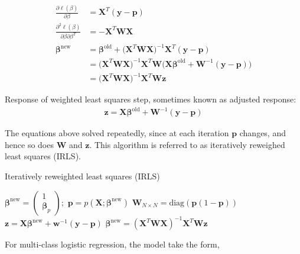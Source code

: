 \documentclass[12pt,a4paper]{article}%
\theoremstyle{definition}
\theoremstyle{plain}
\numberwithin{equation}{section}
\newcounter{subsubsubsection}[subsubsection]
\begin{document}
\begin{align*}
\frac{\partial \ell(\beta)}{\partial \beta} & = \mathbf{X}^{T}(\mathbf{y}-\mathbf{p}) \\
\frac{\partial^{2} \ell(\beta)}{\partial \beta \partial \beta^{T}}  & = -\mathbf{X}^{T} \mathbf{W} \mathbf{X} \\
\boldsymbol{\beta}^{\text{new}} &= \boldsymbol{\beta}^{\text{old}} + \big( \mathbf{X}^{T} \mathbf{W} \mathbf{X} \big)^{-1} \mathbf{X}^{T}(\mathbf{y}-\mathbf{p}) \\
 & = \big( \mathbf{X}^{T} \mathbf{W} \mathbf{X} \big)^{-1} \mathbf{X}^{T} \mathbf{W} \big( \mathbf{X} \boldsymbol{\beta}^{\text{old}} +  \mathbf{W}^{-1}(\mathbf{y}-\mathbf{p})\big) \\
 & = \big( \mathbf{X}^{T} \mathbf{W} \mathbf{X} \big)^{-1} \mathbf{X}^{T} \mathbf{W} \mathbf{z}
\end{align*}

Response of weighted least squares step, sometimes known as adjusted response:
\begin{gather}
\mathbf{z} = \mathbf{X} \boldsymbol{\beta}^{\text{old}} +  \mathbf{W}^{-1}(\mathbf{y}-\mathbf{p})
\end{gather}

The equations above solved repeatedly, since at each iteration $\mathbf{p}$ changes, and hence so does $\mathbf{W}$ and $\mathbf{z}$.
This algorithm is referred to as iteratively reweighed least squares (IRLS).

\begin{algorithm}[H]
\caption{Iteratively reweighted least squares (IRLS)}\label{euclid}
\begin{algorithmic}[1]
\State $\boldsymbol{\beta}^{\text{new}} =  \begin{pmatrix}  1 \\ \boldsymbol{\mathbf{\beta}}_{p}  \end{pmatrix} ;$
\Repeat
\State $\mathbf{p} = p(\mathbf{X};\boldsymbol{\beta}^{\text{new}})$
\State $\mathbf{W}_{N \times N} = \text{diag}(\mathbf{p} (1-\mathbf{p}))$
\State $\mathbf{z} = \mathbf{X}\boldsymbol{\beta}^{\text{new}}+ \mathbf{w}^{-1}(\mathbf{y}-\mathbf{p})$
\State $\boldsymbol{\beta}^{\text{new}} = (\mathbf{X}^{T} \mathbf{W} \mathbf{X})^{-1} \mathbf{X}^{T} \mathbf{W} \mathbf{z} $
\end{algorithmic}
\end{algorithm}

For multi-class logistic regression, the model take the form,
\end{document}
